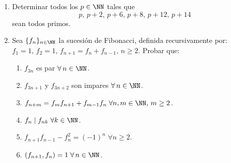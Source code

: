 \documentclass[12pt,spanish,makeidx]{amsbook}
\begin{document}
\begin{enumerate}
\smallskip

\item Determinar todos los $p\in\NN$ tales que
\[ p,\, p+2,\, p+6,\, p+8,\, p+12,\, p+14 \]
sean todos primos.


\smallskip

\item  Sea $\{f_n\}_{n\in\NN}$ la sucesi\'on de Fibonacci, definida recursivamente por: $f_1=1,\, f_2=1$, $f_{n+1}=f_{n}+f_{n-1},\, n\geq 2$. Probar que:
\begin{enumerate}
\item $f_{3n}$ es par $\forall\, n\in\NN$.
\item $f_{3n+1}$ y $f_{3n+2}$ son impares $\forall\, n\in\NN$.
\item $f_{n+m}=f_mf_{n+1}+f_{m-1}f_n\; \forall n,m\in\NN,\, m\geq 2$.
\item $f_n\mid f_{nk}\;  \forall k\in\NN$.
\item $f_{n+1}f_{n-1}-f_n^2=(-1)^n\; \forall n\geq 2$.
\item $(f_{n+1},f_n)=1\; \forall\, n\in\NN$.
\end{enumerate}



\end{enumerate}
\end{document}
